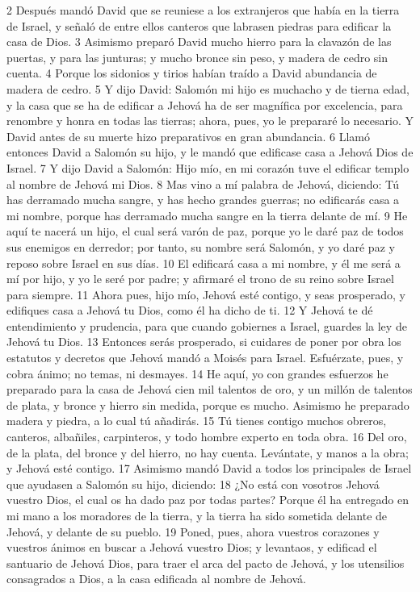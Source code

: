 2 Después mandó David que se reuniese a los extranjeros que había en la tierra de Israel, y señaló de entre ellos canteros que labrasen piedras para edificar la casa de Dios.
3 Asimismo preparó David mucho hierro para la clavazón de las puertas, y para las junturas; y mucho bronce sin peso, y madera de cedro sin cuenta.
4 Porque los sidonios y tirios habían traído a David abundancia de madera de cedro.
5 Y dijo David: Salomón mi hijo es muchacho y de tierna edad, y la casa que se ha de edificar a Jehová ha de ser magnífica por excelencia, para renombre y honra en todas las tierras; ahora, pues, yo le prepararé lo necesario. Y David antes de su muerte hizo preparativos en gran abundancia.
6 Llamó entonces David a Salomón su hijo, y le mandó que edificase casa a Jehová Dios de Israel.
7 Y dijo David a Salomón: Hijo mío, en mi corazón tuve el edificar templo al nombre de Jehová mi Dios.
8 Mas vino a mí palabra de Jehová, diciendo: Tú has derramado mucha sangre, y has hecho grandes guerras; no edificarás casa a mi nombre, porque has derramado mucha sangre en la tierra delante de mí.
9 He aquí te nacerá un hijo, el cual será varón de paz, porque yo le daré paz de todos sus enemigos en derredor; por tanto, su nombre será Salomón, y yo daré paz y reposo sobre Israel en sus días.
10 El edificará casa a mi nombre, y él me será a mí por hijo, y yo le seré por padre; y afirmaré el trono de su reino sobre Israel para siempre. 
11 Ahora pues, hijo mío, Jehová esté contigo, y seas prosperado, y edifiques casa a Jehová tu Dios, como él ha dicho de ti.
12 Y Jehová te dé entendimiento y prudencia, para que cuando gobiernes a Israel, guardes la ley de Jehová tu Dios.
13 Entonces serás prosperado, si cuidares de poner por obra los estatutos y decretos que Jehová mandó a Moisés para Israel. Esfuérzate, pues, y cobra ánimo; no temas, ni desmayes. 
14 He aquí, yo con grandes esfuerzos he preparado para la casa de Jehová cien mil talentos de oro,  y un millón de talentos de plata, y bronce y hierro sin medida, porque es mucho. Asimismo he preparado madera y piedra, a lo cual tú añadirás.
15 Tú tienes contigo muchos obreros, canteros, albañiles, carpinteros, y todo hombre experto en toda obra.
16 Del oro, de la plata, del bronce y del hierro, no hay cuenta. Levántate, y manos a la obra; y Jehová esté contigo.
17 Asimismo mandó David a todos los principales de Israel que ayudasen a Salomón su hijo, diciendo:
18 ¿No está con vosotros Jehová vuestro Dios, el cual os ha dado paz por todas partes? Porque él ha entregado en mi mano a los moradores de la tierra, y la tierra ha sido sometida delante de Jehová, y delante de su pueblo.
19 Poned, pues, ahora vuestros corazones y vuestros ánimos en buscar a Jehová vuestro Dios; y levantaos, y edificad el santuario de Jehová Dios, para traer el arca del pacto de Jehová, y los utensilios consagrados a Dios, a la casa edificada al nombre de Jehová.

